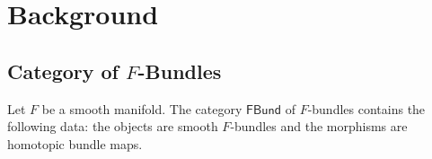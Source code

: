 \documentclass[12pt,class=article,crop=false]{standalone}
\begin{document}
\section{Background}
\subsection{Category of $F$-Bundles}
Let $ F$ be a smooth manifold. The category $ \textsf{FBund} $ of $ F$-bundles contains the following data: the objects are smooth $F $-bundles and the morphisms are homotopic bundle maps. 
\end{document}
